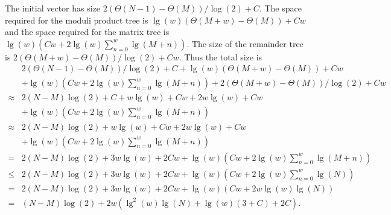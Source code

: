 \documentclass[10pt]{article}
\begin{document}
The initial vector has size $2(\Theta(N-1)-\Theta(M))/\log(2)+C$. The space required for the moduli product tree is $\lg(w)\left(\Theta(M+w)-\Theta(M)\right)+Cw$ and the space required for the matrix tree is $\lg(w)\left(Cw+2\lg(w) \sum_{n=0}^{w} \lg(M+n)\right)$.
The size of the remainder tree is $2\left(\Theta(M+w)-\Theta(M)\right)/\log(2)+Cw$.
Thus the total size is \begin{align*}&2(\Theta(N-1)-\Theta(M))/\log(2)+C+\lg(w)\left(\Theta(M+w)-\Theta(M)\right)+Cw \\ &+\lg(w)\left(Cw+2\lg(w) \sum_{n=0}^{w} \lg(M+n)\right)+2\left(\Theta(M+w)-\Theta(M)\right)/\log(2)+Cw \\ \approx & 2(N-M)\log(2)+C+w\lg(w)+Cw+2w\lg(w)+Cw \\ &+\lg(w)\left(Cw+2\lg(w) \sum_{n=0}^{w} \lg(M+n)\right) \\ \approx & 2(N-M)\log(2)+w\lg(w)+Cw+2w\lg(w)+Cw \\ &+\lg(w)\left(Cw+2\lg(w) \sum_{n=0}^{w} \lg(M+n)\right) \\ =& 2(N-M)\log(2)+3w\lg(w)+2Cw+\lg(w)\left(Cw+2\lg(w) \sum_{n=0}^{w} \lg(M+n)\right) \\ \leq & 2(N-M)\log(2)+3w\lg(w)+2Cw +\lg(w)\left(Cw+2\lg(w) \sum_{n=0}^{w} \lg(N)\right) \\ =&2(N-M)\log(2)+3w\lg(w)+2Cw+\lg(w)\left(Cw+2w\lg(w)\lg(N)\right)\\ =&(N-M)\log(2)+2w\left(\lg^2(w)\lg(N)+\lg(w)(3+C)+2C\right).  \end{align*} 
\end{document}

